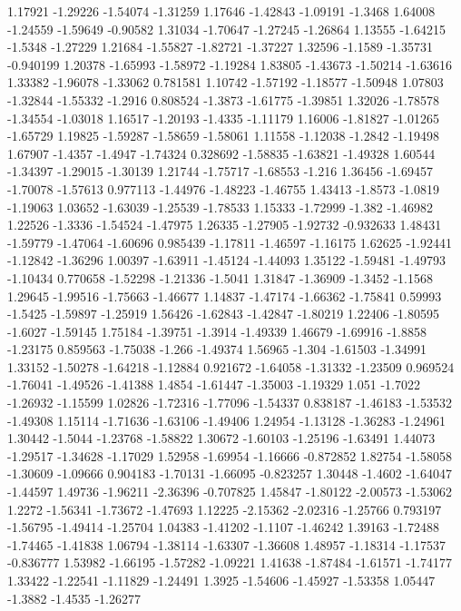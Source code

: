 \documentclass[9pt]{article}
\theoremstyle{plain}
\theoremstyle{definition}
\theoremstyle{remark}
\numberwithin{equation}{section}
\begin{document}
1.17921
-1.29226
-1.54074
-1.31259
1.17646
-1.42843
-1.09191
-1.3468
1.64008
-1.24559
-1.59649
-0.90582
1.31034
-1.70647
-1.27245
-1.26864
1.13555
-1.64215
-1.5348
-1.27229
1.21684
-1.55827
-1.82721
-1.37227
1.32596
-1.1589
-1.35731
-0.940199
1.20378
-1.65993
-1.58972
-1.19284
1.83805
-1.43673
-1.50214
-1.63616
1.33382
-1.96078
-1.33062
0.781581
1.10742
-1.57192
-1.18577
-1.50948
1.07803
-1.32844
-1.55332
-1.2916
0.808524
-1.3873
-1.61775
-1.39851
1.32026
-1.78578
-1.34554
-1.03018
1.16517
-1.20193
-1.4335
-1.11179
1.16006
-1.81827
-1.01265
-1.65729
1.19825
-1.59287
-1.58659
-1.58061
1.11558
-1.12038
-1.2842
-1.19498
1.67907
-1.4357
-1.4947
-1.74324
0.328692
-1.58835
-1.63821
-1.49328
1.60544
-1.34397
-1.29015
-1.30139
1.21744
-1.75717
-1.68553
-1.216
1.36456
-1.69457
-1.70078
-1.57613
0.977113
-1.44976
-1.48223
-1.46755
1.43413
-1.8573
-1.0819
-1.19063
1.03652
-1.63039
-1.25539
-1.78533
1.15333
-1.72999
-1.382
-1.46982
1.22526
-1.3336
-1.54524
-1.47975
1.26335
-1.27905
-1.92732
-0.932633
1.48431
-1.59779
-1.47064
-1.60696
0.985439
-1.17811
-1.46597
-1.16175
1.62625
-1.92441
-1.12842
-1.36296
1.00397
-1.63911
-1.45124
-1.44093
1.35122
-1.59481
-1.49793
-1.10434
0.770658
-1.52298
-1.21336
-1.5041
1.31847
-1.36909
-1.3452
-1.1568
1.29645
-1.99516
-1.75663
-1.46677
1.14837
-1.47174
-1.66362
-1.75841
0.59993
-1.5425
-1.59897
-1.25919
1.56426
-1.62843
-1.42847
-1.80219
1.22406
-1.80595
-1.6027
-1.59145
1.75184
-1.39751
-1.3914
-1.49339
1.46679
-1.69916
-1.8858
-1.23175
0.859563
-1.75038
-1.266
-1.49374
1.56965
-1.304
-1.61503
-1.34991
1.33152
-1.50278
-1.64218
-1.12884
0.921672
-1.64058
-1.31332
-1.23509
0.969524
-1.76041
-1.49526
-1.41388
1.4854
-1.61447
-1.35003
-1.19329
1.051
-1.7022
-1.26932
-1.15599
1.02826
-1.72316
-1.77096
-1.54337
0.838187
-1.46183
-1.53532
-1.49308
1.15114
-1.71636
-1.63106
-1.49406
1.24954
-1.13128
-1.36283
-1.24961
1.30442
-1.5044
-1.23768
-1.58822
1.30672
-1.60103
-1.25196
-1.63491
1.44073
-1.29517
-1.34628
-1.17029
1.52958
-1.69954
-1.16666
-0.872852
1.82754
-1.58058
-1.30609
-1.09666
0.904183
-1.70131
-1.66095
-0.823257
1.30448
-1.4602
-1.64047
-1.44597
1.49736
-1.96211
-2.36396
-0.707825
1.45847
-1.80122
-2.00573
-1.53062
1.2272
-1.56341
-1.73672
-1.47693
1.12225
-2.15362
-2.02316
-1.25766
0.793197
-1.56795
-1.49414
-1.25704
1.04383
-1.41202
-1.1107
-1.46242
1.39163
-1.72488
-1.74465
-1.41838
1.06794
-1.38114
-1.63307
-1.36608
1.48957
-1.18314
-1.17537
-0.836777
1.53982
-1.66195
-1.57282
-1.09221
1.41638
-1.87484
-1.61571
-1.74177
1.33422
-1.22541
-1.11829
-1.24491
1.3925
-1.54606
-1.45927
-1.53358
1.05447
-1.3882
-1.4535
-1.26277
\end{document}
